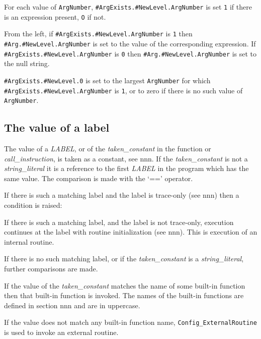 For each value of \texttt{ArgNumber},
\texttt{\#ArgExists.\#NewLevel.ArgNumber} is set
\texttt{\textquotesingle{}1\textquotesingle{}} if there is an expression
present, \texttt{\textquotesingle{}O\textquotesingle{}} if not.

From the left, if \texttt{\#ArgExists.\#NewLevel.ArgNumber} is
\texttt{\textquotesingle{}1\textquotesingle{}} then
\texttt{\#Arg.\#NewLevel.ArgNumber} is set to the value of the
corresponding expression. If \texttt{\#ArgExists.\#NewLevel.ArgNumber}
is \texttt{\textquotesingle{}0\textquotesingle{}} then
\texttt{\#Arg.\#NewLevel.ArgNumber} is set to the null string.

\texttt{\#ArgExists.\#NewLevel.0} is set to the largest
\texttt{ArgNumber} for which \texttt{\#ArgExists.\#NewLevel.ArgNumber}
is \texttt{\textquotesingle{}1\textquotesingle{}}, or to zero if there
is no such value of \texttt{ArgNumber}.

\subsection{The value of a label}\label{the-value-of-a-label}

The value of a \emph{LABEL}, or of the \emph{taken\_constant} in the
function or \emph{call\_instruction}, is taken as a constant, see nnn.
If the \emph{taken\_constant} is not a \emph{string\_literal} it is a
reference to the first \emph{LABEL} in the program which has the same
value. The comparison is made with the `==' operator.

If there is such a matching label and the label is trace-only (see nnn)
then a condition is raised:



If there is such a matching label, and the label is not trace-only,
execution continues at the label with routine initialization (see nnn).
This is execution of an internal routine.

If there is no such matching label, or if the \emph{taken\_constant} is
a \emph{string\_literal}, further comparisons are made.

If the value of the \emph{taken\_constant} matches the name of some
built-in function then that built-in function is invoked. The names of
the built-in functions are defined in section nnn and are in uppercase.

If the value does not match any built-in function name,
\texttt{Config\_ExternalRoutine} is used to invoke an external routine.

